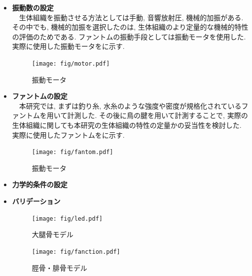 \begin{itemize}
\item{\bf 振動数の設定}
\\\ \ 生体組織を振動させる方法としては手動, 音響放射圧, 機械的加振がある. その中でも, 機械的加振を選択したのは, 生体組織のより定量的な機械的特性の評価のためである. ファントムの振動手段としては振動モータを使用した. 実際に使用した振動モータをに示す.
\begin{figure}[H]
  \begin{center}
    \texttt{[image: fig/motor.pdf]}
  \end{center}
  \caption{振動モータ}
\end{figure}
\item{\bf ファントムの設定}
\\\ \ 本研究では, まずは釣り糸, 水糸のような強度や密度が規格化されているファントムを用いて計測した. その後に鳥の腱を用いて計測することで, 実際の生体組織に関しても本研究の生体組織の特性の定量かの妥当性を検討した. 実際に使用したファントムをに示す.
\begin{figure}[H]
  \begin{center}
    \texttt{[image: fig/fantom.pdf]}
  \end{center}
  \caption{振動モータ}
\end{figure}
\item{\bf 力学的条件の設定}
\item{\bf バリデーション}
\begin{figure}[H]
 \begin{minipage}{0.5\hsize}
  \begin{center}
   \texttt{[image: fig/led.pdf]}
  \end{center}
  \caption{大腿骨モデル}
 \end{minipage}
 \begin{minipage}{0.5\hsize}
 \begin{center}
  \texttt{[image: fig/fanction.pdf]}
 \end{center}
  \caption{脛骨・腓骨モデル}
 \end{minipage}
\end{figure}
\end{itemize}
